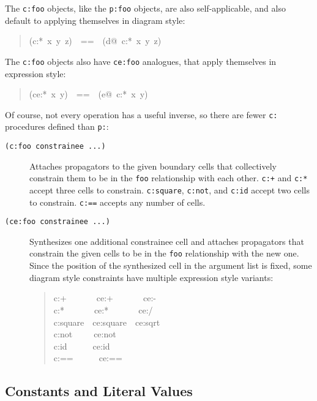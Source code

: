 \documentclass[12pt,letterpaper,english]{article}
\begin{document}
The \texttt{c:foo} objects, like the \texttt{p:foo} objects, are also
self-applicable, and also default to applying themselves
in diagram style:
\begin{quote}{\ttfamily \raggedright \noindent
(c:*~x~y~z)~~==~~(d@~c:*~x~y~z)
}\end{quote}

The \texttt{c:foo} objects also have \texttt{ce:foo} analogues, that
apply themselves in expression style:
\begin{quote}{\ttfamily \raggedright \noindent
(ce:*~x~y)~~==~~(e@~c:*~x~y)
}\end{quote}

Of course, not every operation has a useful inverse, so there are
fewer \texttt{c:} procedures defined than \texttt{p:}:
\begin{description}
\item[{\texttt{(c:foo constrainee ...)}}] \leavevmode 
Attaches propagators to the given boundary cells that collectively
constrain them to be in the \texttt{foo} relationship with each other.
\texttt{c:+} and \texttt{c:*} accept three cells to constrain.  \texttt{c:square},
\texttt{c:not}, and \texttt{c:id} accept two cells to constrain.  \texttt{c:==}
accepts any number of cells.

\item[{\texttt{(ce:foo constrainee ...)}}] \leavevmode 
Synthesizes one additional constrainee cell and attaches propagators
that constrain the given cells to be in the \texttt{foo} relationship
with the new one.  Since the position of the synthesized cell in
the argument list is fixed, some diagram style constraints have
multiple expression style variants:
\begin{quote}{\ttfamily \raggedright \noindent
c:+~~~~~~~ce:+~~~~~~~ce:-~\\
c:*~~~~~~~ce:*~~~~~~~ce:/~\\
c:square~~ce:square~~ce:sqrt~\\
c:not~~~~~ce:not~\\
c:id~~~~~~ce:id~\\
c:==~~~~~~ce:==
}\end{quote}
\end{description}



\hypertarget{constants-and-literal-values}{}
\subsection{Constants and Literal Values}
\label{constants-and-literal-values}
\end{document}
